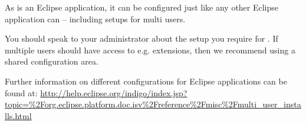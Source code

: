 As \app{} is an Eclipse application, it can be configured just like any other Eclipse application can -- including setups for multi users. 

You should speak to your administrator about the setup you require for \app{}. If multiple users should have access to e.g. extensions, then we recommend using a shared configuration area. 

Further information on different configurations for Eclipse applications can be found at:
\url{http://help.eclipse.org/indigo/index.jsp?topic=\%2Forg.eclipse.platform.doc.isv\%2Freference\%2Fmisc\%2Fmulti_user_installs.html}
